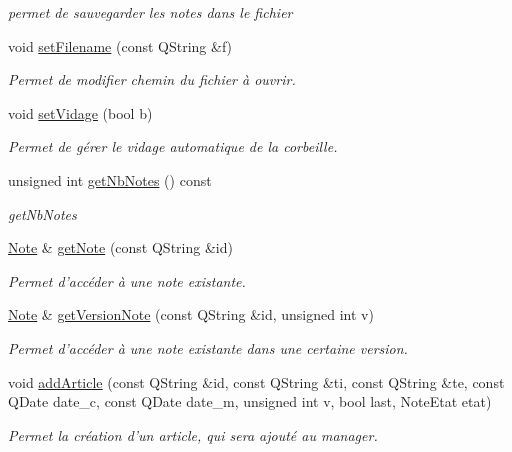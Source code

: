 \begin{DoxyCompactItemize}
\begin{DoxyCompactList}\small\item\em permet de sauvegarder les notes dans le fichier \end{DoxyCompactList}\item 
void \hyperlink{class_notes_manager_ad91ac409c3c42399e702a0863d4274b1}{set\-Filename} (const Q\-String \&f)
\begin{DoxyCompactList}\small\item\em Permet de modifier chemin du fichier à ouvrir. \end{DoxyCompactList}\item 
void \hyperlink{class_notes_manager_a7a35eea20ba64e4b773384ecd322a9f0}{set\-Vidage} (bool b)
\begin{DoxyCompactList}\small\item\em Permet de gérer le vidage automatique de la corbeille. \end{DoxyCompactList}\item 
unsigned int \hyperlink{class_notes_manager_aa91d616beba1cde35545beb5db52df10}{get\-Nb\-Notes} () const 
\begin{DoxyCompactList}\small\item\em get\-Nb\-Notes \end{DoxyCompactList}\item 
\hyperlink{class_note}{Note} \& \hyperlink{class_notes_manager_a9c401bfe7c91ab37a7c8c4db398e92ff}{get\-Note} (const Q\-String \&id)
\begin{DoxyCompactList}\small\item\em Permet d'accéder à une note existante. \end{DoxyCompactList}\item 
\hyperlink{class_note}{Note} \& \hyperlink{class_notes_manager_ae91fa3093de4757c8ddfcdafdd456d96}{get\-Version\-Note} (const Q\-String \&id, unsigned int v)
\begin{DoxyCompactList}\small\item\em Permet d'accéder à une note existante dans une certaine version. \end{DoxyCompactList}\item 
void \hyperlink{class_notes_manager_a7d21acc4089a57251fc1755f2a039356}{add\-Article} (const Q\-String \&id, const Q\-String \&ti, const Q\-String \&te, const Q\-Date date\-\_\-c, const Q\-Date date\-\_\-m, unsigned int v, bool last, Note\-Etat etat)
\begin{DoxyCompactList}\small\item\em Permet la création d'un article, qui sera ajouté au manager. \end{DoxyCompactList}\item 

\end{DoxyCompactItemize}

